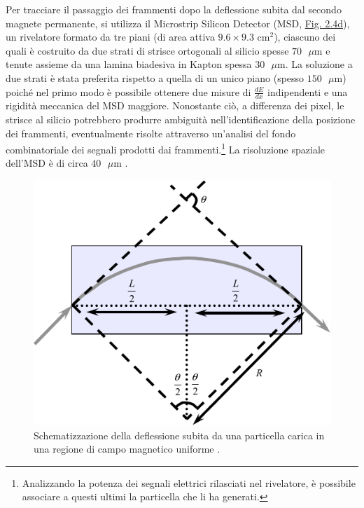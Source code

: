 \documentclass[12pt,a4paper,twoside]{report}
\begin{document}
	Per tracciare il passaggio dei frammenti dopo la deflessione subita dal secondo magnete permanente, si utilizza il Microstrip Silicon Detector (MSD, \hyperref[fig:msd]{Fig. 2.4d}), un rivelatore formato da tre piani (di area attiva $9.6\times9.3\mbox{ cm}^2$), ciascuno dei quali è costruito da due strati di strisce ortogonali al silicio spesse $70\mbox{ }\mu\mbox{m}$ e tenute assieme da una lamina biadesiva in Kapton spessa $30\mbox{ }\mu\mbox{m}$. La soluzione a due strati è stata preferita rispetto a quella di un unico piano (spesso $150\mbox{ }\mu\mbox{m}$) poiché nel primo modo è possibile ottenere due misure di $\frac{dE}{dx}$ indipendenti e una rigidità meccanica del MSD maggiore. Nonostante ciò, a differenza dei pixel, le strisce al silicio potrebbero produrre ambiguità nell'identificazione della posizione dei frammenti, eventualmente risolte attraverso un'analisi del fondo combinatoriale dei segnali prodotti dai frammenti.\footnote{Analizzando la potenza dei segnali elettrici rilasciati nel rivelatore, è possibile associare a questi ultimi la particella che li ha generati.} La risoluzione spaziale dell'MSD è di circa $40\mbox{ }\mu\mbox{m}$ \cite{foot_cdr,ubaldiArticle}.
	\begin{figure}[H]
		\centering
		\includegraphics[width=0.8\linewidth]{momentum_deflession.pdf}
		\caption{Schematizzazione della deflessione subita da una particella carica in una regione di campo magnetico uniforme \cite{leoniS}.}
		\label{fig:momentum_deflession}
	\end{figure}
	
\end{document}
